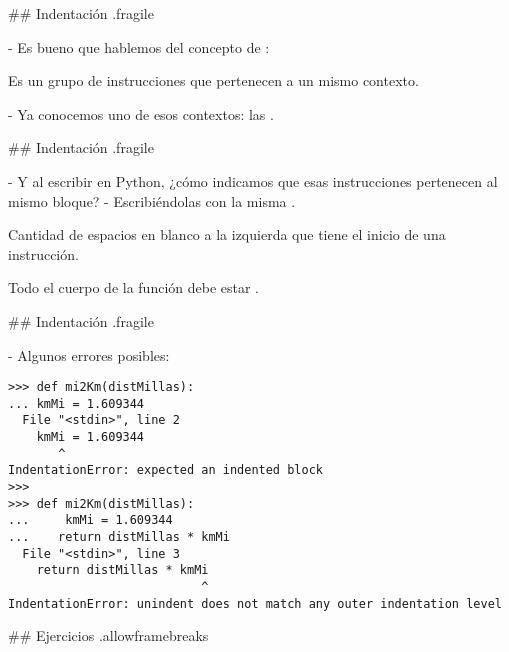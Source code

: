 \trmcolumns
{}

## Indentación {.fragile}

- Es bueno que hablemos del concepto de :

\bgnblockdefinition
{} Es un grupo de instrucciones que pertenecen a un mismo contexto.
\trmblockdefinition

- Ya conocemos uno de esos contextos: las .

## Indentación {.fragile}

- Y al escribir en Python, ¿cómo indicamos que esas instrucciones pertenecen al mismo bloque?
    - Escribiéndolas con la misma .

\pause

\bgnblockdefinition
{} Cantidad de espacios en blanco a la izquierda que tiene el inicio de una instrucción.
\trmblockdefinition

\vspace{2ex}

\pause

\bgnblockidea
Todo el cuerpo de la función debe estar .
\trmblockidea


## Indentación {.fragile}

- Algunos errores posibles:

\begin{lstlisting}
>>> def mi2Km(distMillas):
... kmMi = 1.609344
  File "<stdin>", line 2
    kmMi = 1.609344
       ^
IndentationError: expected an indented block
>>>
>>> def mi2Km(distMillas):
...     kmMi = 1.609344
...    return distMillas * kmMi
  File "<stdin>", line 3
    return distMillas * kmMi
                           ^
IndentationError: unindent does not match any outer indentation level
\end{lstlisting}

## Ejercicios {.allowframebreaks}

